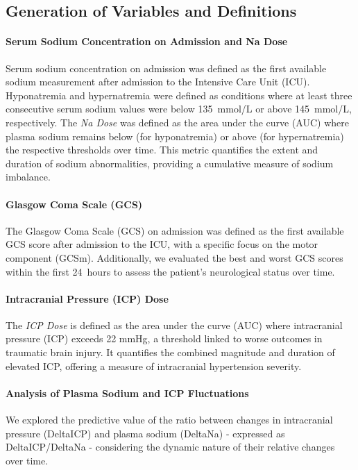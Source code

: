 \subsection{Generation of Variables and Definitions}

\paragraph{Serum Sodium Concentration on Admission and Na Dose}

Serum sodium concentration on admission was defined as the first available sodium measurement after admission to the Intensive Care Unit (ICU). Hyponatremia and hypernatremia were defined as conditions where at least three consecutive serum sodium values were below 135~mmol/L or above 145~mmol/L, respectively. The \textit{Na Dose} was defined as the area under the curve (AUC) where plasma sodium remains below (for hyponatremia) or above (for hypernatremia) the respective thresholds over time. This metric quantifies the extent and duration of sodium abnormalities, providing a cumulative measure of sodium imbalance.

\paragraph{Glasgow Coma Scale (GCS)}

The Glasgow Coma Scale (GCS) on admission was defined as the first available GCS score after admission to the ICU, with a specific focus on the motor component (GCSm). Additionally, we evaluated the best and worst GCS scores within the first 24~hours to assess the patient's neurological status over time. 

\paragraph{Intracranial Pressure (ICP) Dose}
The \textit{ICP Dose} is defined as the area under the curve (AUC) where intracranial pressure (ICP) exceeds 22 mmHg, a threshold linked to worse outcomes in traumatic brain injury. It quantifies the combined magnitude and duration of elevated ICP, offering a measure of intracranial hypertension severity.


\paragraph{Analysis of Plasma Sodium and ICP Fluctuations}

We explored the predictive value of the ratio between changes in intracranial pressure (DeltaICP) and plasma sodium (DeltaNa) - expressed as DeltaICP/DeltaNa - considering the dynamic nature of their relative changes over time. 

